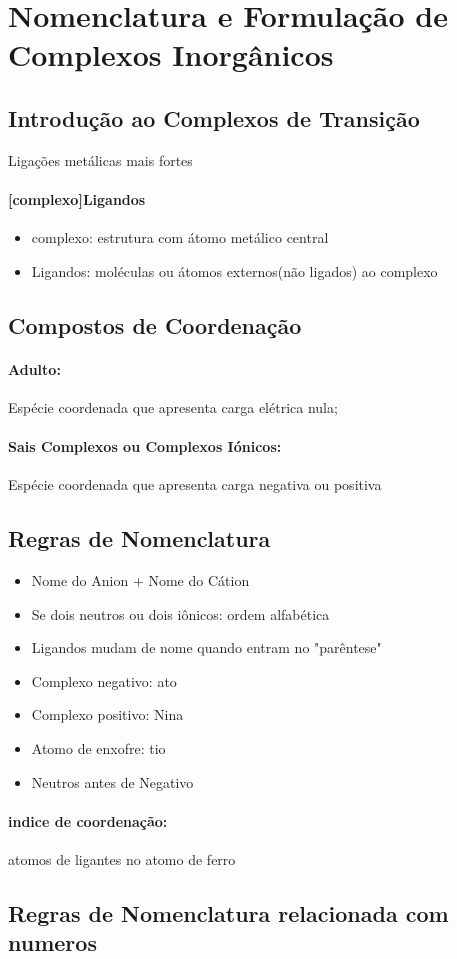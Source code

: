 \documentclass[12pt]{report}
\begin{document}
\break

\section{Nomenclatura e Formulação de Complexos Inorgânicos}

\subsection{Introdução ao Complexos de Transição}

Ligações metálicas mais fortes

\paragraph{[complexo]Ligandos}
\begin{itemize}
\item complexo: estrutura com átomo metálico central
\item Ligandos: moléculas ou átomos externos(não ligados) ao complexo
\end{itemize}

\subsection{Compostos de Coordenação}
\paragraph{Adulto:} Espécie coordenada que apresenta carga elétrica nula;

\paragraph{Sais Complexos ou Complexos Iónicos: } Espécie coordenada que apresenta carga negativa ou positiva

\subsection{Regras de Nomenclatura}
\begin{itemize}
\item Nome do Anion + Nome do Cátion
\item Se dois neutros ou dois iônicos: ordem alfabética
\item Ligandos mudam de nome quando entram no "parêntese"
\item Complexo negativo: ato
\item Complexo positivo: Nina
\item Atomo de enxofre: tio
\item Neutros antes de Negativo
\end{itemize}

\paragraph{indice de coordenação: } atomos de ligantes no atomo de ferro

\subsection{Regras de Nomenclatura relacionada com numeros}
\end{document}
